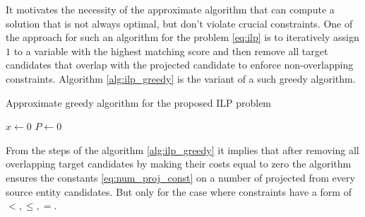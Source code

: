 It motivates the necessity of the approximate algorithm that can compute a solution that is not always
optimal, but don't violate crucial constraints. One of the approach for such an algorithm for the problem
\eqref{eq:ilp} is to iteratively assign \( 1 \) to a variable with the highest matching score and then remove
all target candidates that overlap with the projected candidate to enforce non-overlapping constraints.
Algorithm \ref{alg:ilp_greedy} is the variant of a such greedy algorithm.

\begin{algorithm}
    \caption{Approximate greedy algorithm for the proposed ILP problem} \label{alg:ilp_greedy}

    \( x \gets 0 \) \;
    \( P \gets 0 \) 
\end{algorithm}

From the steps of the algorithm \ref{alg:ilp_greedy} it implies that after removing all
overlapping target candidates by making their costs equal to zero the algorithm ensures the
constants \eqref{eq:num_proj_const} on a number of projected from every source entity candidates.
But only for the case where constraints have a form of \( <, \leq, = \).

